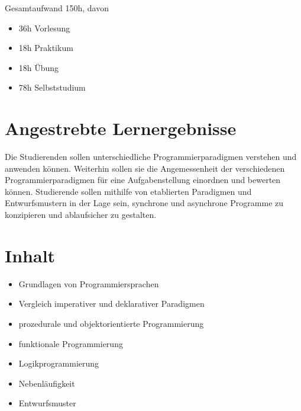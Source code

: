 Gesamtaufwand 150h, davon

\begin{itemize}
\tightlist
\item
  36h Vorlesung
\item
  18h Praktikum
\item
  18h Übung
\item
  78h Selbststudium
\end{itemize}

\hypertarget{angestrebte-lernergebnissepathlabelmi-2017modulbeschreibungen-bachelorba_paradigmen-der-programmierung}{%
\section*{Angestrebte
Lernergebnisse\label{/mi-2017/modulbeschreibungen-bachelor/BA_Paradigmen-der-Programmierung}}\label{angestrebte-lernergebnissepathlabelmi-2017modulbeschreibungen-bachelorba_paradigmen-der-programmierung}}

Die Studierenden sollen unterschiedliche Programmierparadigmen verstehen
und anwenden können. Weiterhin sollen sie die Angemessenheit der
verschiedenen Programmierparadigmen für eine Aufgabenstellung einordnen
und bewerten können. Studierende sollen mithilfe von etablierten
Paradigmen und Entwurfsmustern in der Lage sein, synchrone und
asynchrone Programme zu konzipieren und ablaufsicher zu gestalten.

\hypertarget{inhaltpathlabelmi-2017modulbeschreibungen-bachelorba_paradigmen-der-programmierung}{%
\section*{Inhalt\label{/mi-2017/modulbeschreibungen-bachelor/BA_Paradigmen-der-Programmierung}}\label{inhaltpathlabelmi-2017modulbeschreibungen-bachelorba_paradigmen-der-programmierung}}

\begin{itemize}
\tightlist
\item
  Grundlagen von Programmiersprachen
\item
  Vergleich imperativer und deklarativer Paradigmen
\item
  prozedurale und objektorientierte Programmierung
\item
  funktionale Programmierung
\item
  Logikprogrammierung
\item
  Nebenläufigkeit
\item
  Entwurfsmuster
\end{itemize}

